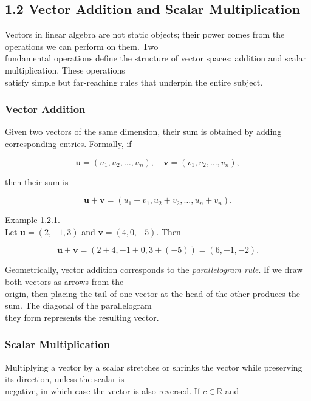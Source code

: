 \documentclass[
  12pt,
  a4paper,
]{article}
\begin{document}
\subsection{1.2 Vector Addition and Scalar
Multiplication}\label{12-vector-addition-and-scalar-multiplication}

Vectors in linear algebra are not static objects; their power comes from
the operations we can perform on them. Two\\
fundamental operations define the structure of vector spaces: addition
and scalar multiplication. These operations\\
satisfy simple but far-reaching rules that underpin the entire subject.

\subsubsection{Vector Addition}\label{vector-addition}

Given two vectors of the same dimension, their sum is obtained by adding
corresponding entries. Formally, if

\[\mathbf{u} = (u_1, u_2, \dots, u_n), \quad
\mathbf{v} = (v_1, v_2, \dots, v_n),\]

then their sum is

\[\mathbf{u} + \mathbf{v} = (u_1+v_1, u_2+v_2, \dots, u_n+v_n).\]

Example 1.2.1.\\
Let \(\mathbf{u} = (2, -1, 3)\) and \(\mathbf{v} = (4, 0, -5)\). Then

\[\mathbf{u} + \mathbf{v} = (2+4, -1+0, 3+(-5)) = (6, -1, -2).\]

Geometrically, vector addition corresponds to the \emph{parallelogram
rule}. If we draw both vectors as arrows from the\\
origin, then placing the tail of one vector at the head of the other
produces the sum. The diagonal of the parallelogram\\
they form represents the resulting vector.

\subsubsection{Scalar Multiplication}\label{scalar-multiplication}

Multiplying a vector by a scalar stretches or shrinks the vector while
preserving its direction, unless the scalar is\\
negative, in which case the vector is also reversed. If
\(c \in \mathbb{R}\) and
\end{document}
